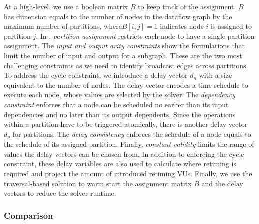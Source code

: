 At a high-level, we use a boolean matrix $B$ to keep track of the assignment. 
$B$ has dimension equals to the number of nodes in the dataflow graph by the maximum number of partitions, where$B[i,j]=1$ 
indicates node $i$ is assigned to partition $j$.
In , \emph{partition assignment} restricts each node to have a single partition assignment.
The \emph{input and output arity constraints} show the formulations that limit the number of input
and output for a subgraph.
These are the two most challenging constraints as we need to identify broadcast edges across partitions.
To address the cycle constraint, we introduce a delay vector $d_n$ with a size equivalent to the number of nodes. 
The delay vector encodes a time schedule to execute each node, whose values are selected by the solver.
The \emph{dependency constraint} enforces that a node can be scheduled no earlier than its input dependencies and
no later than its output dependents.
Since the operations within a partition have to be triggered atomically, there is another delay
vector $d_p$ for partitions. The \emph{delay consistency} enforces the schedule of a node equals to the
schedule of its assigned partition.
Finally, \emph{constant validity} limits the range of values the delay vectors can be chosen from.
In addition to enforcing the cycle constraint, 
these delay variables are also used to calculate where retiming is required and project the amount of introduced retiming VUs. 
Finally, we use the traversal-based solution to warm start the assignment matrix
$B$ and the delay vectors to reduce the solver runtime.

\subsubsection{Comparison}

